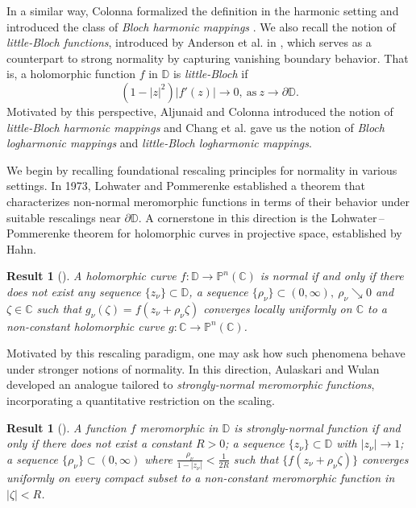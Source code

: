 \documentclass[11pt, reqno]{amsart}
\newtheorem{Result}[theorem]{Result}
\theoremstyle{definition}
\theoremstyle{remark}
\numberwithin{equation}{section}
\begin{document}
 In a similar way, Colonna formalized the definition in the harmonic setting 
 and introduced the class of \emph{Bloch harmonic mappings} 
 \cite{colonna-tbcobhm-1989}. We also recall the notion of \emph{little-Bloch functions}, introduced by Anderson et al. in \cite{anderson-obfanf-1974},
 which serves as a counterpart to strong normality by capturing vanishing boundary 
 behavior. That is, a holomorphic function $f$ in $\mathbb D$ is \emph{little-Bloch} if
 \begin{equation*}(1-|z|^2)|f'(z)|\to 0,\ \text{as}\ z\to\partial\mathbb D.\end{equation*}
 Motivated by this 
 perspective, Aljunaid and Colonna \cite{aljuain-cobtsohm-2019} introduced the notion of \emph{little-Bloch harmonic mappings} and Chang et al. 
 \cite{chang-csolmalbtc-2026} gave us the notion of \emph{Bloch logharmonic mappings} and \emph{little-Bloch logharmonic mappings}.\smallskip
 
We begin by recalling foundational rescaling principles for normality in various settings. In 
1973, Lohwater and Pommerenke \cite[Theorem 1]{lohwater-onmf-1973} established a theorem that characterizes non-normal meromorphic functions
in terms of their behavior under suitable rescalings near $\partial\mathbb D$. A cornerstone in 
this direction is the Lohwater\,–\,Pommerenke theorem for holomorphic curves in projective space, established by Hahn.
\begin{Result}[{\cite[Theorem 4]{hahn-hdgosctonmf-2007}}]\label{R:LPNHC} 
A holomorphic curve $f:\mathbb{D}\to \mathbb P^n(\mathbb C)$ is normal if and only if there does not
exist any sequence $\{z_{\nu}\}\subset \mathbb{D}$, a sequence $\{\rho_{\nu} \}\subset(0,\infty),\ \rho_{\nu} \searrow 0$
and $\zeta\in \mathbb C$ such that $g_{\nu}(\zeta)=f(z_{\nu}+\rho_{\nu} \zeta)$ converges locally uniformly on $\mathbb C$ to a non-constant 
holomorphic curve $g:\mathbb C\to \mathbb P^n{(\mathbb C)}$. 
\end{Result}
Motivated by this rescaling paradigm, one may ask how such phenomena behave under stronger notions of 
normality. In this direction, Aulaskari and Wulan developed an analogue tailored to \emph{strongly-normal meromorphic functions},
incorporating a quantitative restriction on the scaling.
\begin{Result} [{\cite[Theorem 1]{aulaskari-avotlptfsnf-2001}}] \label{R:LPMF}
A function $f$ meromorphic in $\mathbb{D}$ is strongly-normal function
if and only if there does not exist a constant $R>0$; a sequence $\{z_{\nu}\}\subset \mathbb{D}$ with $|z_{\nu}|\to1$; 
a sequence $\{\rho_{\nu} \}\subset(0,\infty)$ where $\displaystyle\frac{\rho_{\nu} }{1-|z_{\nu}|}<\frac{1}{2R}$ such that $\{f(z_{\nu}+\rho_{\nu} \zeta)\}$ converges uniformly on every 
compact subset to a non-constant meromorphic function in $|\zeta|<R$.
\end{Result}
\end{document}

